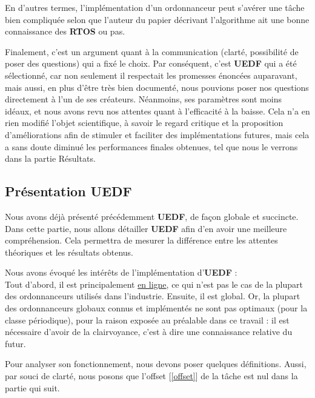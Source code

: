 	En d'autres termes, l'implémentation d'un ordonnanceur peut s'avérer une tâche bien compliquée selon que l'auteur du papier décrivant l'algorithme 
	ait une bonne connaissance des \textbf{RTOS} ou pas. 
	\newline

	
	Finalement, c'est un argument quant à la communication (clarté, possibilité de poser des questions) 
	qui a fixé le choix. Par conséquent, c'est \textbf{UEDF} qui a été sélectionné, car 
	non seulement il respectait 
	les promesses énoncées auparavant, mais aussi, en plus d'être très bien documenté, 
	nous pouvions poser nos questions directement à l'un de ses créateurs. Néanmoins, ses paramètres sont moins idéaux, 
	et nous avons revu nos attentes quant à l'efficacité à la baisse. Cela n'a en rien 
	modifié l'objet scientifique, à savoir le regard critique et la proposition d'améliorations 
	afin de stimuler et faciliter des implémentations futures, mais cela a sans doute 
	diminué les performances finales obtenues, tel que nous le verrons dans la partie Résultats.\newline
	
	
	\subsection{Présentation UEDF}
	
	Nous avons déjà présenté précédemment \textbf{UEDF}, de façon globale et succincte. 
	Dans cette partie, nous allons détailler \textbf{UEDF} afin d'en avoir une meilleure compréhension. Cela 
	permettra de mesurer la différence entre les attentes théoriques et les résultats obtenus.\newline

	Nous avons évoqué les intérêts de l'implémentation d'\textbf{UEDF} :\\
	Tout d'abord, il est principalement \hyperref[inline]{en ligne}, ce qui n'est pas le cas de 
	la plupart des ordonnanceurs utilisés dans l'industrie.
	Ensuite, il est global. Or, la plupart des ordonnanceurs 
	globaux connus et implémentés ne sont pas optimaux (pour la classe périodique), pour la
	raison exposée au préalable dans ce travail : il est nécessaire d'avoir de la clairvoyance, 
	c'est à dire une connaissance relative du futur.\newline
	
	Pour analyser son fonctionnement, nous devons poser quelques définitions. Aussi, par souci de clarté, nous posons que 
	l'offset [\ref*{offset}] de la tâche est nul dans la partie qui suit.\\
